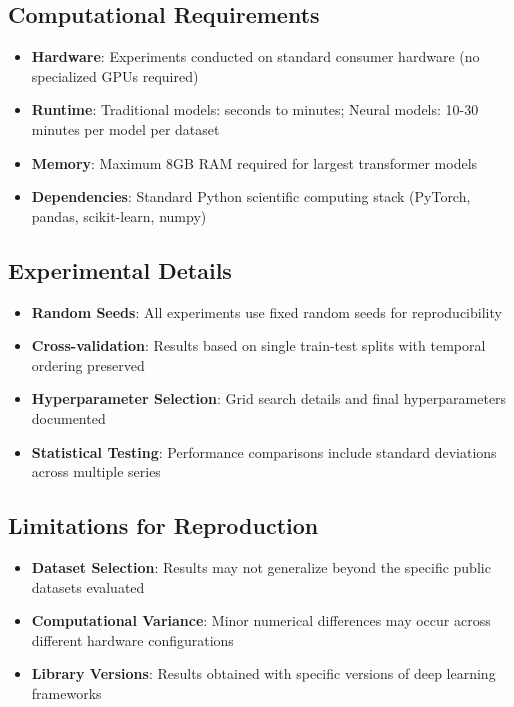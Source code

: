 \documentclass[11pt]{article}
\begin{document}
\subsection*{Computational Requirements}

\begin{itemize}
\item \textbf{Hardware}: Experiments conducted on standard consumer hardware (no specialized GPUs required)
\item \textbf{Runtime}: Traditional models: seconds to minutes; Neural models: 10-30 minutes per model per dataset
\item \textbf{Memory}: Maximum 8GB RAM required for largest transformer models
\item \textbf{Dependencies}: Standard Python scientific computing stack (PyTorch, pandas, scikit-learn, numpy)
\end{itemize}

\subsection*{Experimental Details}

\begin{itemize}
\item \textbf{Random Seeds}: All experiments use fixed random seeds for reproducibility
\item \textbf{Cross-validation}: Results based on single train-test splits with temporal ordering preserved
\item \textbf{Hyperparameter Selection}: Grid search details and final hyperparameters documented
\item \textbf{Statistical Testing}: Performance comparisons include standard deviations across multiple series
\end{itemize}

\subsection*{Limitations for Reproduction}

\begin{itemize}
\item \textbf{Dataset Selection}: Results may not generalize beyond the specific public datasets evaluated
\item \textbf{Computational Variance}: Minor numerical differences may occur across different hardware configurations
\item \textbf{Library Versions}: Results obtained with specific versions of deep learning frameworks
\end{itemize}
\end{document}
